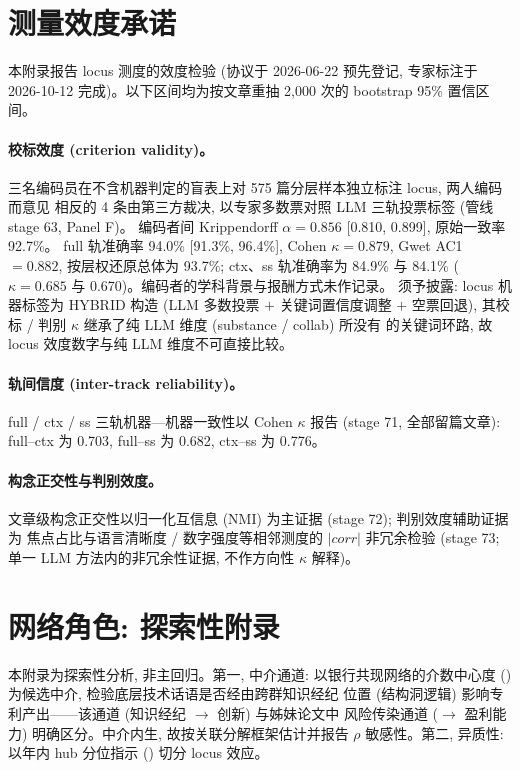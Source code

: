 \appendix

\section{测量效度承诺}\label{app:validity}

本附录报告 locus 测度的效度检验 (协议于 2026-06-22 预先登记, 专家标注于
2026-10-12 完成)。以下区间均为按文章重抽 2{,}000 次的 bootstrap 95\% 置信区间。

\paragraph{校标效度 (criterion validity)。}
三名编码员在不含机器判定的盲表上对 575 篇分层样本独立标注 locus, 两人编码而意见
相反的 4 条由第三方裁决, 以专家多数票对照 LLM 三轨投票标签 (管线 stage 63, Panel F)。
编码者间 Krippendorff $\alpha = 0.856$ [0.810, 0.899], 原始一致率 92.7\%。
full 轨准确率 94.0\% [91.3\%, 96.4\%], Cohen $\kappa = 0.879$, Gwet AC1 $= 0.882$,
按层权还原总体为 93.7\%; ctx、ss 轨准确率为 84.9\% 与 84.1\%
($\kappa = 0.685$ 与 0.670)。编码者的学科背景与报酬方式未作记录。
须予披露: locus 机器标签为 HYBRID 构造 (LLM 多数投票 $+$ 关键词置信度调整 $+$
空票回退), 其校标 / 判别 $\kappa$ 继承了纯 LLM 维度 (substance / collab) 所没有
的关键词环路, 故 locus 效度数字与纯 LLM 维度不可直接比较。

\paragraph{轨间信度 (inter-track reliability)。}
full / ctx / ss 三轨机器—机器一致性以 Cohen $\kappa$ 报告 (stage 71, 全部留篇文章):
full--ctx 为 0.703, full--ss 为 0.682, ctx--ss 为 0.776。

\paragraph{构念正交性与判别效度。}
文章级构念正交性以归一化互信息 (NMI) 为主证据 (stage 72); 判别效度辅助证据为
焦点占比与语言清晰度 / 数字强度等相邻测度的 $|corr|$ 非冗余检验 (stage 73;
单一 LLM 方法内的非冗余性证据, 不作方向性 $\kappa$ 解释)。

\section{网络角色: 探索性附录}\label{app:network}

本附录为探索性分析, 非主回归。第一, 中介通道: 以银行共现网络的介数中心度
() 为候选中介, 检验底层技术话语是否经由跨群知识经纪
位置 (结构洞逻辑) 影响专利产出——该通道 (知识经纪 $\to$ 创新) 与姊妹论文中
风险传染通道 ($\to$ 盈利能力) 明确区分。中介内生, 故按关联分解框架估计并报告
\textcite{imai2010general} $\rho$ 敏感性。第二, 异质性: 以年内 hub 分位指示
() 切分 locus 效应。

